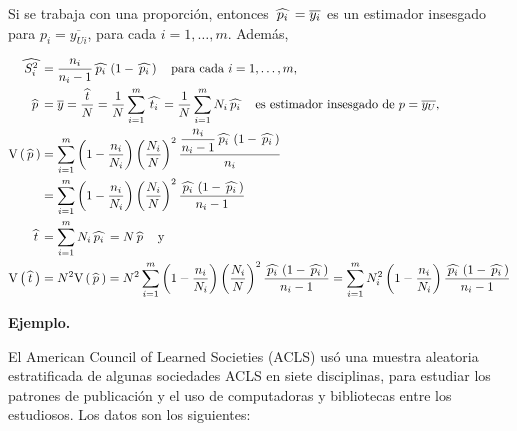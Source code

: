 \documentclass[12pt, fleqn]{article}
\newcommand{\gorro}[1]{\widehat{\hspace{0.7mm} #1 \hspace{0.7mm}}}
\newcommand{\V}[1]{\mathrm{V} \left( #1 \right)}
\begin{document}
    Si se trabaja con una proporción, entonces $ \gorro{p_i} = \overline{y_i} $ es un estimador insesgado para $ p_i = \overline{y_{Ui}} $, para cada $ i = 1, \ldots, m $. Además, 

    \begin{align*}
        \gorro{S_i^2} &= \dfrac{n_i}{n_i - 1} \gorro{p_i} \left( 1 - \gorro{p_i} \right) \quad \mbox{para cada } i = 1, \ldots, m, \\
        \gorro{p} &= \overline{y} = \dfrac{\gorro{t}}{N} = \dfrac{1}{N} \sum_{i=1}^{m} \gorro{t_i} = \dfrac{1}{N} \sum_{i=1}^{m} N_i \gorro{p_i} \quad \mbox{es estimador insesgado de } p = \overline{y_U}, \\
        \V{\gorro{p}} &= \sum_{i=1}^{m} \left( 1 - \dfrac{n_i}{N_i} \right) \left( \dfrac{N_i}{N} \right)^2 \dfrac{\dfrac{n_i}{n_i - 1} \gorro{p_i} \left( 1 - \gorro{p_i} \right)}{n_i} \\
        &= \sum_{i=1}^{m} \left( 1 - \dfrac{n_i}{N_i} \right) \left( \dfrac{N_i}{N} \right)^2 \dfrac{\gorro{p_i} \left( 1 - \gorro{p_i} \right)}{n_i - 1} \\
        \gorro{t} &= \sum_{i=1}^{m} N_i \gorro{p_i} = N \gorro{p} \quad \mbox{y} \\
        \V{\gorro{t}} &= N^2 \V{\gorro{p}} = N^2 \sum_{i=1}^{m} \left( 1 - \dfrac{n_i}{N_i} \right) \left( \dfrac{N_i}{N} \right)^2 \dfrac{\gorro{p_i} \left( 1 - \gorro{p_i} \right)}{n_i - 1} = \sum_{i=1}^{m} N_i^2 \left( 1 - \dfrac{n_i}{N_i} \right) \dfrac{\gorro{p_i} \left( 1 - \gorro{p_i} \right)}{n_i - 1}
    \end{align*}

    \textbf{Ejemplo.}

    El American Council of Learned Societies (ACLS) usó una muestra aleatoria estratificada de algunas sociedades ACLS en siete disciplinas, para estudiar los patrones de publicación y el uso de computadoras y bibliotecas entre los estudiosos. Los datos son los siguientes:
\end{document}
